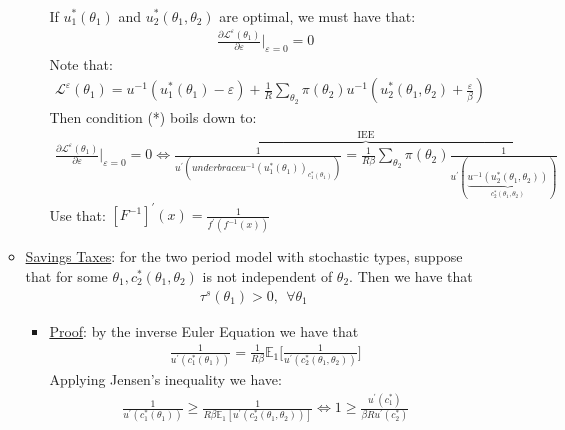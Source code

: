 \documentclass{article}
\begin{document}
\begin{itemize}
\begin{itemize}
\begin{itemize}
\begin{gather*}
             \end{gather*}
             If $u_{1}^{*}(\theta_{1})$ and $u_{2}^{*}(\theta_{1}, \theta_{2})$ are optimal, we must have that:
             \begin{gather*}
                 \frac{\partial \mathcal{L}^{\varepsilon}(\theta_{1})}{\partial \varepsilon} \big|_{\varepsilon = 0} = 0 \tag{*}
             \end{gather*}
             Note that:
             \begin{gather*}
                 \mathcal{L}^{\varepsilon} (\theta_{1}) = u^{-1}(u_{1}^{*}(\theta_{1}) - \varepsilon) + \frac{1}{R} \sum_{\theta_{2}} \pi (\theta_{2}) u^{-1} (u_{2}^{*}(\theta_{1}, \theta_{2}) + \tfrac{\varepsilon}{\beta})
             \end{gather*}
             Then condition (*) boils down to:
             \begin{gather*}
                 \frac{\partial \mathcal{L}^{\varepsilon}(\theta_{1})}{\partial \varepsilon} \big|_{\varepsilon = 0} = 0 \Leftrightarrow \overbrace{\frac{1}{u^{'}(underbrace{u^{-1}(u_{1}^{*}(\theta_{1}))}_{c_{1}^{*}(\theta_{1})})} = \frac{1}{R \beta} \sum_{\theta_{2}} \pi(\theta_{2}) \frac{1}{u^{'}(\underbrace{ u^{-1} (u_{2}^{*}(\theta_{1}, \theta_{2})) }_{c_{2}^{*}(\theta_{1},\theta_{2})})} }^{\text{IEE}}
             \end{gather*}
             Use that: $[F^{-1}]^{'}(x) = \frac{1}{f^{'}(f^{-1}(x))}$
         \end{itemize}
         \item  \underline{Savings Taxes}: for the two period model with stochastic types, suppose that for some $\theta_{1}, c_{2}^{*}(\theta_{1}, \theta_{2})$ is not independent of $\theta_{2}$. Then we have that
         \begin{gather*}
             \tau^{s}(\theta_{1}) > 0, \ \ \forall \theta_{1}
         \end{gather*}
         \begin{itemize}
             \item  \underline{Proof}: by the inverse Euler Equation we have that
             \begin{gather*}
                 \frac{1}{u^{'}(c_{1}^{*}(\theta_{1}))} = \frac{1}{R \beta} \mathbb{E}_{1} \big[\frac{1}{u^{'}(c_{2}^{*}(\theta_{1}, \theta_{2}))} \big]
             \end{gather*}
             Applying Jensen's inequality we have:
             \begin{gather*}
                 \frac{1}{u^{'}(c_{1}^{*}(\theta_{1}))} \geq \frac{1}{R \beta \mathbb{E}_{1}[u^{'}(c_{2}^{*}(\theta_{1}, \theta_{2}))]} \Leftrightarrow 1 \geq \frac{u^{'}(c_{1}^{*})}{\beta R u^{'}(c_{2}^{*})}

\end{gather*}
\end{itemize}
\end{itemize}
\end{itemize}
\end{document}
